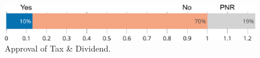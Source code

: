 \documentclass[english,5p,authoryear]{elsarticle}
\begin{document}

\begin{figure}[t]
\centering
\includegraphics[width=\columnwidth]{Images_EPS/approval_trim.eps}
\caption{Approval of Tax \& Dividend.}
\label{fig:approval}
\end{figure}

\end{document}
